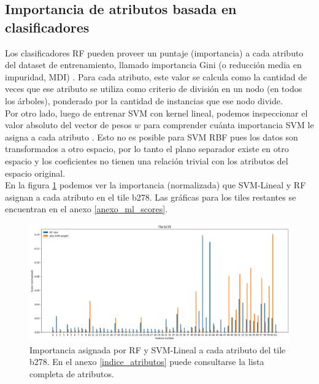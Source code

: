 \subsection{Importancia de atributos basada en clasificadores}

Los clasificadores RF pueden proveer un puntaje (importancia) a cada atributo del dataset de entrenamiento, llamado importancia Gini (o reducción media en impuridad, MDI) \cite{statisticallearning}. Para cada atributo, este valor se calcula como la cantidad de veces que ese atributo se utiliza como criterio de división en un nodo (en todos los árboles), ponderado por la cantidad de instancias que ese nodo divide. \\

Por otro lado, luego de entrenar SVM con kernel lineal, podemos inspeccionar el valor absoluto del vector de pesos $w$ para comprender cuánta importancia SVM le asigna a cada atributo \cite{svm_importance}. Esto no es posible para SVM RBF pues los datos son transformados a otro espacio, por lo tanto el plano separador existe en otro espacio y los coeficientes no tienen una relación trivial con los atributos del espacio original. \\

En la figura \ref{fig:ml_importance_b278} podemos ver la importancia (normalizada) que SVM-Lineal y RF asignan a cada atributo en el tile b278. Las gráficas para los tiles restantes se encuentran en el anexo \ref{anexo_ml_scores}. \\

\begin{figure}[h!]
\centering
  \includegraphics[width=1\textwidth]{Kap6/test=b278_ML_variable_importance_scores}
\caption{ Importancia asignada por RF y SVM-Lineal a cada atributo del tile b278. En el anexo \protect\ref{indice_atributos} puede consultarse la lista completa de atributos. }
\label{fig:ml_importance_b278}
\end{figure}

